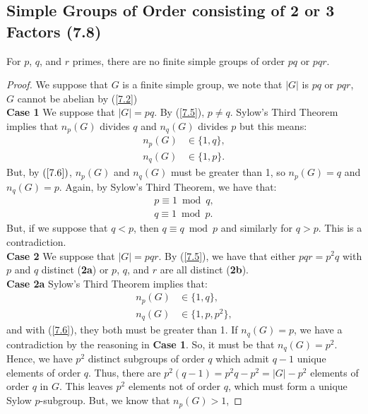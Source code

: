 \subsection{Simple Groups of Order consisting of 2 or 3 Factors (7.8)} \label{7.8}

For $p$, $q$, and $r$ primes, there are no finite simple groups of order $pq$ or $pqr$.

\begin{proof}
    We suppose that $G$ is a finite simple group, we note that
    $|G|$ is $pq$ or $pqr$, $G$ cannot be abelian by (\ref{7.2})
    \\[\baselineskip]
    \textbf{Case 1} We suppose that $|G| = pq$. By (\ref{7.5}),
    $p \neq q$. Sylow's Third Theorem implies that $n_p(G)$ 
    divides $q$ and $n_q(G)$ divides $p$ but this means: \begin{align*}
        n_p(G) &\in \{1, q\}, \\
        n_q(G) &\in \{1, p\}.
    \end{align*} But, by $(\ref{7.6})$, $n_p(G)$ and $n_q(G)$ must
    be greater than 1, so $n_p(G) = q$ and $n_q(G) = p$.
    Again, by Sylow's Third Theorem, we have that: \begin{align*}
        p \equiv 1 \bmod q, \\ 
        q \equiv 1 \bmod p.
    \end{align*} But, if we suppose that $q < p$, then $q \equiv q
    \bmod p$ and similarly for $q > p$. This is a contradiction.
    \\[\baselineskip]
    \textbf{Case 2} We suppose that $|G| = pqr$. By (\ref{7.5}),
    we have that either $pqr = p^2q$ with $p$ and $q$ distinct 
    (\textbf{2a})
    or $p$, $q$, and $r$ are all distinct (\textbf{2b}).
    \\[\baselineskip]
    \textbf{Case 2a} Sylow's Third Theorem implies that: \begin{align*}
        n_p(G) &\in \{1, q\}, \\
        n_q(G) &\in \{1, p, p^2\},
    \end{align*} and with (\ref{7.6}), they both must be greater than
    1. If $n_q(G) = p$, we have a contradiction by the reasoning
    in \textbf{Case 1}. So, it must be that $n_q(G) = p^2$. Hence, we have 
    $p^2$ distinct subgroups of order $q$ which admit $q - 1$
    unique elements of order $q$. Thus, there are 
    $p^2(q - 1) = p^2q - p^2 = |G| - p^2$ elements of order $q$ in $G$.
    This leaves $p^2$ elements not of order $q$, which must form
    a unique Sylow $p$-subgroup. But, we know that $n_p(G) > 1$,

\end{proof}

